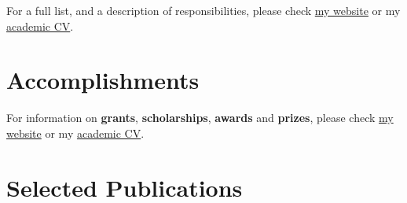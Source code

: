 \documentclass[11pt,a4paper,]{awesome-cv}
\begin{document}
For a full list, and a description of responsibilities, please check
\href{https://jdleongomez.info/en/profile/\#experience}{my website} or
my \href{https://jdleongomez.info/en/files/jdl_cv_en.pdf}{academic CV}.

\begin{cventries}
    \vspace{-4.0mm}
\end{cventries}

\hypertarget{accomplishments}{%
\section{Accomplishments}\label{accomplishments}}

For information on \textbf{grants}, \textbf{scholarships},
\textbf{awards} and \textbf{prizes}, please check
\href{https://jdleongomez.info/en/profile/\#accomplishments}{my website}
or my \href{https://jdleongomez.info/en/files/jdl_cv_en.pdf}{academic
CV}.

\hypertarget{selected-publications}{%
\section{Selected Publications}\label{selected-publications}}
\end{document}
